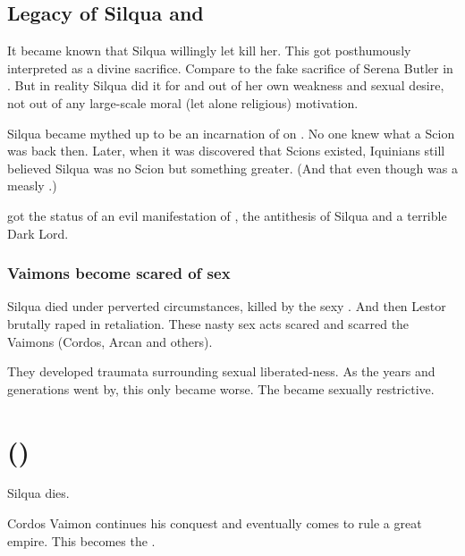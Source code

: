 \subsection{Legacy of Silqua and \Delphine}
It became known that Silqua willingly let \Delphine{} kill her. 
This got posthumously interpreted as a divine sacrifice. 
Compare to the fake sacrifice of Serena Butler in \cite{BrianHerbert:LegendsofDune}. 
But in reality Silqua did it for \Delphine{} and out of her own weakness and sexual desire, not out of any large-scale moral (let alone religious) motivation. 

Silqua became mythed up to be an incarnation of \iquin{} on \Miith{}. 
No one knew what a Scion was back then.
Later, when it was discovered that Scions existed, Iquinians still believed Silqua was no Scion but something greater. 
(And that even though \Aryal{} was a measly \thelyad.) 

\Delphine{} got the status of an evil manifestation of \itzach, the antithesis of Silqua and a terrible Dark Lord. 





\subsubsection{Vaimons become scared of sex}
Silqua died under perverted circumstances, killed by the sexy \Delphine. 
And then Lestor \Delaen brutally raped \Delphine{} in retaliation. 
These nasty sex acts scared and scarred the Vaimons (Cordos, Arcan and others). 

They developed traumata surrounding sexual liberated-ness. 
As the years and generations went by, this only became worse. 
The \VaimonCaliphate became sexually restrictive. 















\section{\Caliphate ()}
Silqua dies. 

Cordos Vaimon continues his conquest and eventually comes to rule a great empire. This becomes the \VaimonCaliphate. 









